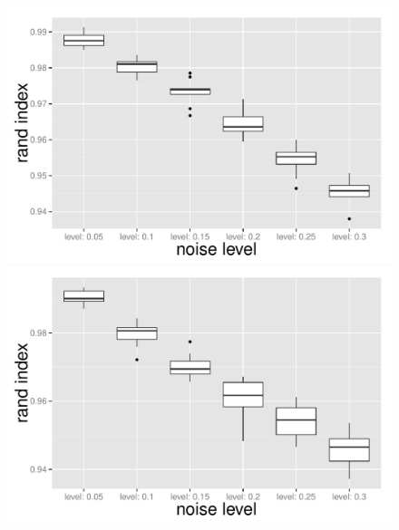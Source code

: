 \begin{figure}
  \begin{minipage}[t]{0.33\textwidth}
    \centering
    \includegraphics[width=\textwidth,height=0.8\textwidth]{fig/noise_boxplot_row.pdf}
    \subcaption{}
  \end{minipage}
  \begin{minipage}[t]{0.33\textwidth}
    \centering
    \includegraphics[width=\textwidth,height=0.8\textwidth]{fig/noise_boxplot_col.pdf}
    \subcaption{}
  \end{minipage}
  \begin{minipage}[t]{0.34\textwidth}

\end{minipage}
\end{figure}
